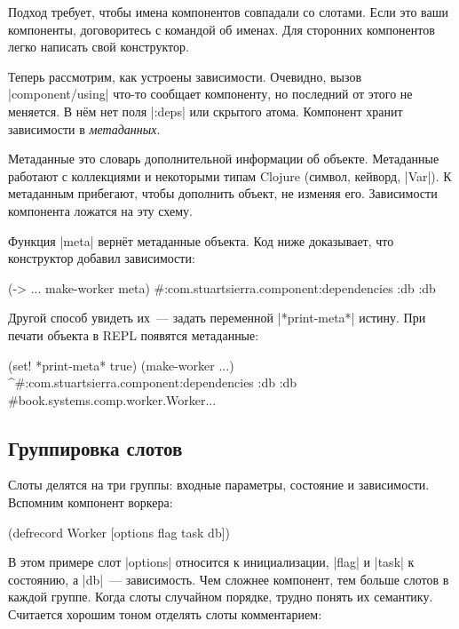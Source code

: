 Подход требует, чтобы имена компонентов совпадали со слотами. Если это ваши
компоненты, договоритесь с командой об именах. Для сторонних компонентов легко
написать свой конструктор.

Теперь рассмотрим, как устроены зависимости. Очевидно, вызов
\spverb|component/using| что-то сообщает компоненту, но последний от этого не
меняется. В н\"{е}м нет поля \spverb|:deps| или скрытого атома. Компонент хранит
зависимости в \emph{метаданных}.

Метаданные это словарь дополнительной информации об объекте. Метаданные работают
с коллекциями и некоторыми типам Clojure (символ, кейворд, \spverb|Var|). К
метаданным прибегают, чтобы дополнить объект, не изменяя его. Зависимости
компонента ложатся на эту схему.

Функция \spverb|meta| верн\"{е}т метаданные объекта. Код ниже доказывает, что
конструктор добавил зависимости:

\begin{english}
  \begin{clojure}
(-> {...} make-worker meta)
#:com.stuartsierra.component{:dependencies {:db :db}}
  \end{clojure}
\end{english}

Другой способ увидеть их~--- задать переменной \spverb|*print-meta*| истину. При
печати объекта в REPL появятся метаданные:

\begin{english}
  \begin{clojure}
(set! *print-meta* true)
(make-worker {...})
^#:com.stuartsierra.component{:dependencies {:db :db}}
#book.systems.comp.worker.Worker{...}
  \end{clojure}
\end{english}

\subsection{Группировка слотов}

Слоты делятся на три группы: входные параметры, состояние и
зависимости. Вспомним компонент воркера:

\begin{english}
  \begin{clojure}
(defrecord Worker
    [options flag task db])
  \end{clojure}
\end{english}

В этом примере слот \spverb|options| относится к инициализации, \spverb|flag| и
\spverb|task| к состоянию, а \spverb|db|~--- зависимость. Чем сложнее компонент,
тем больше слотов в каждой группе. Когда слоты случайном порядке, трудно понять
их семантику. Считается хорошим тоном отделять слоты комментарием:

